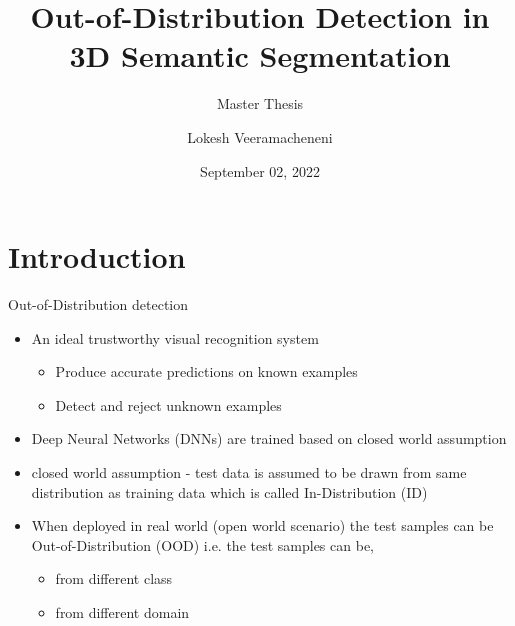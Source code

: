 \documentclass[aspectratio=169]{beamer}
\author[Veeramacheneni]{Lokesh Veeramacheneni}
\title{Out-of-Distribution Detection in 3D Semantic Segmentation}
\subtitle{Master Thesis}
\institute[HBRS]{Hochschule Bonn-Rhein-Sieg}
\date{September 02, 2022}
\begin{document}
{
\begin{frame}
\titlepage
\end{frame}
}

\section{Introduction}
\begin{frame}{Out-of-Distribution detection}
    \begin{itemize}
        \item An ideal trustworthy visual recognition system
        \begin{itemize}
            \item Produce accurate predictions on known examples
            \item Detect and reject unknown examples
        \end{itemize}
        \item Deep Neural Networks (DNNs) are trained based on closed world assumption
        \item closed world assumption - test data is assumed to be drawn from same distribution as training data which is called In-Distribution (ID)
        \item When deployed in real world (open world scenario) the test samples can be Out-of-Distribution (OOD) i.e. the test samples can be,
        \begin{itemize}
            \item from different class
            \item from different domain 
        \end{itemize}
    \end{itemize}
\end{frame}
\end{document}

